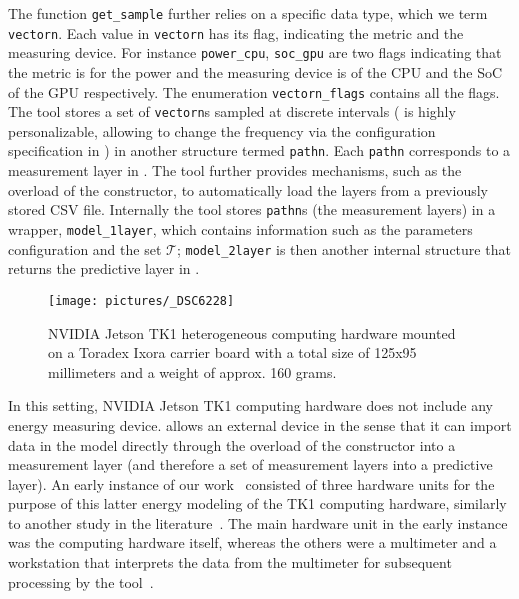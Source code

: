 The function {\small\tt get\_sample} further relies on a specific data type, which we term {\small\tt vectorn}. Each value in {\small\tt vectorn} has its flag, indicating the metric and the measuring device. For instance {\small\tt power\_cpu}, {\small\tt soc\_gpu} are two flags indicating that the metric is for the power and the measuring device is of
the CPU and the SoC of the GPU respectively. The enumeration {\small\tt vectorn\_flags} contains all the flags. The tool stores a set of {\small\tt vectorn}s sampled at discrete intervals (\powprof{} is highly personalizable, allowing to change the frequency via the configuration specification in ) in another structure termed {\small\tt pathn}. Each {\small\tt pathn} corresponds to a measurement layer in . The tool further provides mechanisms, such as the overload of the constructor, to automatically load the layers from a previously stored CSV file. Internally the tool stores {\small\tt pathn}s (the measurement layers) in a wrapper, {\small\tt model\_1layer}, which contains information such as the parameters configuration and the set $\mathcal{T}$; {\small\tt model\_2layer} is then another internal structure that returns the predictive layer in . 
\begin{figure}[h!]
  \sfr
  \centering 
  \texttt{[image: pictures/\_DSC6228]}
  \caption[NVIDIA Jetson TK1 heterogeneous computing hardware]{NVIDIA Jetson TK1 heterogeneous computing hardware mounted on a Toradex Ixora carrier board with a total size of 125x95 millimeters and a weight of approx. 160 grams.} 
  \label{fig:tk1}
  \efr
\end{figure}
In this setting, NVIDIA Jetson TK1 computing hardware does not include any energy measuring device. \powprof{} allows an external device in the sense that it can import data in the model directly through the overload of the constructor into a measurement layer (and therefore a set of measurement layers into a predictive layer). An early instance of our work~\citep{seewald2019hlpgpu} consisted of three hardware units for the purpose of this latter energy modeling of the TK1 computing hardware, similarly to another study in the literature~\citep{calore2015energy}. The main hardware unit in the early instance was the computing hardware itself, whereas the others were a multimeter and a workstation that interprets the data from the multimeter for subsequent processing by the tool~\citep{seewald2019coarse}.

